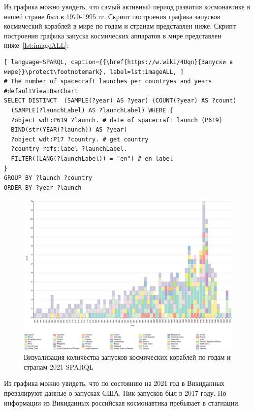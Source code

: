 Из графика можно увидеть, что самый активный период развития космонавтике в нашей стране был в 1970-1995 гг.
Скрипт построения графика запусков космический кораблей в мире по годам и странам представлен ниже: Скрипт построения графика запуска космических аппаратов в мире представлен ниже~\ref{lst:imageALL}:
\begin{lstlisting}[ language=SPARQL, caption={{\href{https://w.wiki/4Uqn}{Запуски в мире}}\protect\footnotemark}, label=lst:imageALL, ]
# The number of spacecraft launches per countryes and years
#defaultView:BarChart
SELECT DISTINCT  (SAMPLE(?year) AS ?year) (COUNT(?year) AS ?count)
  (SAMPLE(?launchLabel) AS ?launchLabel) WHERE {
  ?object wdt:P619 ?launch. # date of spacecraft launch (P619)
  BIND(str(YEAR(?launch)) AS ?year)
  ?object wdt:P17 ?country. # get country
  ?country rdfs:label ?launchLabel.
  FILTER((LANG(?launchLabel)) = "en") # en label
}
GROUP BY ?launch ?country
ORDER BY ?year ?launch
\end{lstlisting}

\begin{figure}[h!]
  \includegraphics[width=\linewidth]{graphics/chapter/spacecraft_space_station/ImgALL.png}
  \caption[График мир]{Визуализация количества запусков космических кораблей по годам и странам 2021 SPARQL}%
  \label{fig:ImgALL}%
\end{figure}

Из графика можно увидеть, что по состоянию на 2021 год в Викиданных превалируют данные о запусках США. Пик запусков был в 2017 году. По информации из Викиданных российская космонавтика пребывает в стагнации.
